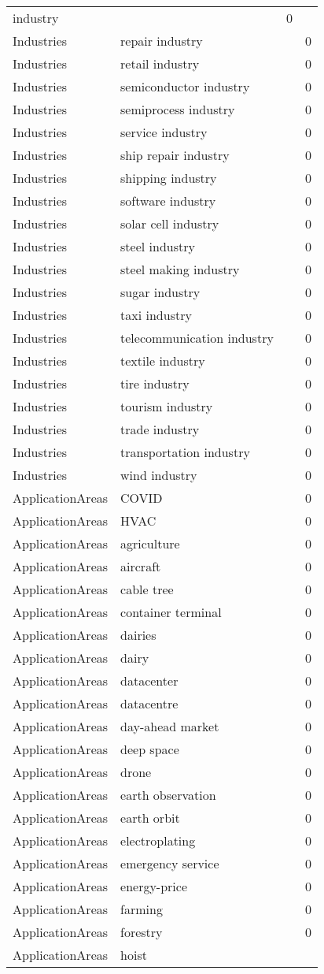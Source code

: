 {\begin{longtable}{lp{10cm}rr}
industry &  & 0\\Industries & repair industry &  & 0\\Industries & retail industry &  & 0\\Industries & semiconductor industry &  & 0\\Industries & semiprocess industry &  & 0\\Industries & service industry &  & 0\\Industries & ship repair industry &  & 0\\Industries & shipping industry &  & 0\\Industries & software industry &  & 0\\Industries & solar cell industry &  & 0\\Industries & steel industry &  & 0\\Industries & steel making industry &  & 0\\Industries & sugar industry &  & 0\\Industries & taxi industry &  & 0\\Industries & telecommunication industry &  & 0\\Industries & textile industry &  & 0\\Industries & tire industry &  & 0\\Industries & tourism industry &  & 0\\Industries & trade industry &  & 0\\Industries & transportation industry &  & 0\\Industries & wind industry &  & 0\\ApplicationAreas & COVID &  & 0\\ApplicationAreas & HVAC &  & 0\\ApplicationAreas & agriculture &  & 0\\ApplicationAreas & aircraft &  & 0\\ApplicationAreas & cable tree &  & 0\\ApplicationAreas & container terminal &  & 0\\ApplicationAreas & dairies &  & 0\\ApplicationAreas & dairy &  & 0\\ApplicationAreas & datacenter &  & 0\\ApplicationAreas & datacentre &  & 0\\ApplicationAreas & day-ahead market &  & 0\\ApplicationAreas & deep space &  & 0\\ApplicationAreas & drone &  & 0\\ApplicationAreas & earth observation &  & 0\\ApplicationAreas & earth orbit &  & 0\\ApplicationAreas & electroplating &  & 0\\ApplicationAreas & emergency service &  & 0\\ApplicationAreas & energy-price &  & 0\\ApplicationAreas & farming &  & 0\\ApplicationAreas & forestry &  & 0\\ApplicationAreas & hoist &  & 
\end{longtable}}
